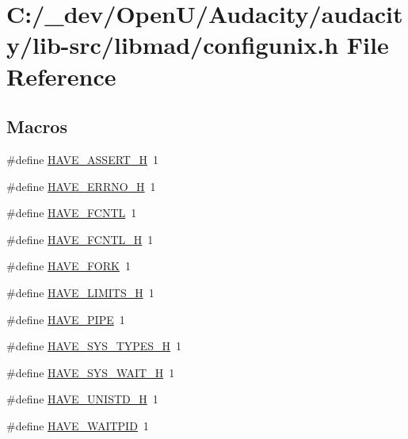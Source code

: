 \hypertarget{lib-src_2libmad_2configunix_8h}{}\section{C\+:/\+\_\+dev/\+Open\+U/\+Audacity/audacity/lib-\/src/libmad/configunix.h File Reference}
\label{lib-src_2libmad_2configunix_8h}
\subsection*{Macros}
\begin{DoxyCompactItemize}
\item 
\#define \hyperlink{lib-src_2libmad_2configunix_8h_ad0eabe2e5407bc73450eb15b657983cd}{H\+A\+V\+E\+\_\+\+A\+S\+S\+E\+R\+T\+\_\+H}~1
\item 
\#define \hyperlink{lib-src_2libmad_2configunix_8h_ae655a511fd230d2fd6b99ff2801df201}{H\+A\+V\+E\+\_\+\+E\+R\+R\+N\+O\+\_\+H}~1
\item 
\#define \hyperlink{lib-src_2libmad_2configunix_8h_ab53dd6545477520d29f820298445a440}{H\+A\+V\+E\+\_\+\+F\+C\+N\+TL}~1
\item 
\#define \hyperlink{lib-src_2libmad_2configunix_8h_a765d75020849aa0a9b6becd9a5b7a193}{H\+A\+V\+E\+\_\+\+F\+C\+N\+T\+L\+\_\+H}~1
\item 
\#define \hyperlink{lib-src_2libmad_2configunix_8h_af5eda00981183c9820f5930f0933c293}{H\+A\+V\+E\+\_\+\+F\+O\+RK}~1
\item 
\#define \hyperlink{lib-src_2libmad_2configunix_8h_ac70f0930238c8d095d7cc2ee8b522c77}{H\+A\+V\+E\+\_\+\+L\+I\+M\+I\+T\+S\+\_\+H}~1
\item 
\#define \hyperlink{lib-src_2libmad_2configunix_8h_a994277e7708bc6af2b551ce70e1e323a}{H\+A\+V\+E\+\_\+\+P\+I\+PE}~1
\item 
\#define \hyperlink{lib-src_2libmad_2configunix_8h_a69dc70bea5d1f8bd2be9740e974fa666}{H\+A\+V\+E\+\_\+\+S\+Y\+S\+\_\+\+T\+Y\+P\+E\+S\+\_\+H}~1
\item 
\#define \hyperlink{lib-src_2libmad_2configunix_8h_af249315f5939884ce5b4585ca81a1e39}{H\+A\+V\+E\+\_\+\+S\+Y\+S\+\_\+\+W\+A\+I\+T\+\_\+H}~1
\item 
\#define \hyperlink{lib-src_2libmad_2configunix_8h_a219b06937831d0da94d801ab13987639}{H\+A\+V\+E\+\_\+\+U\+N\+I\+S\+T\+D\+\_\+H}~1
\item 
\#define \hyperlink{lib-src_2libmad_2configunix_8h_a9196ec9c05152e1058c8a20a5ffd3f1a}{H\+A\+V\+E\+\_\+\+W\+A\+I\+T\+P\+ID}~1

\end{DoxyCompactItemize}

